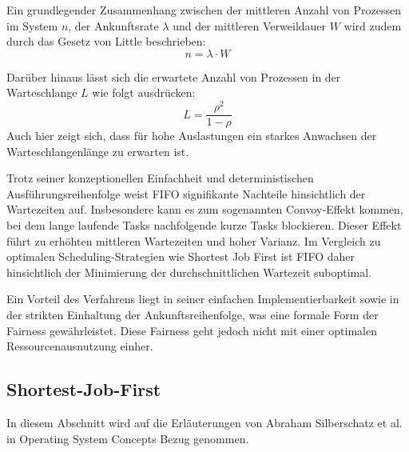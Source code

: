 \begin{sloppypar}
\vspace{7.56mm}

\noindent Ein grundlegender Zusammenhang zwischen der mittleren Anzahl von Prozessen im System $n$, der Ankunftsrate $\lambda$ und der mittleren Verweildauer $W$ wird zudem durch das Gesetz von Little beschrieben:
\begin{equation}
n = \lambda \cdot W
\end{equation}

\vspace{7.56mm}

\noindent Darüber hinaus lässt sich die erwartete Anzahl von Prozessen in der Warteschlange $L$ wie folgt ausdrücken:
\begin{equation}
L = \frac{\rho^2}{1 - \rho}
\end{equation}
Auch hier zeigt sich, dass für hohe Auslastungen ein starkes Anwachsen der Warteschlangenlänge zu erwarten ist.

\vspace{7.56mm}

\noindent Trotz seiner konzeptionellen Einfachheit und deterministischen Ausführungsreihenfolge weist \acs{FIFO} signifikante Nachteile hinsichtlich der Wartezeiten auf.
Insbesondere kann es zum sogenannten Convoy-Effekt kommen, 
bei dem lange laufende Tasks nachfolgende kurze Tasks blockieren.
Dieser Effekt führt zu erhöhten mittleren Wartezeiten und hoher Varianz.
Im Vergleich zu optimalen Scheduling-Strategien wie Shortest Job First ist \acs{FIFO} daher hinsichtlich der Minimierung der durchschnittlichen Wartezeit suboptimal.

\vspace{7.56mm}

\noindent Ein Vorteil des Verfahrens liegt in seiner einfachen Implementierbarkeit sowie in der strikten Einhaltung der Ankunftsreihenfolge, was eine formale Form der Fairness gewährleistet.
Diese Fairness geht jedoch nicht mit einer optimalen Ressourcenausnutzung einher.



\subsection{Shortest-Job-First}
\noindent In diesem Abschnitt wird auf die Erläuterungen von Abraham Silberschatz et al. in Operating System Concepts \cite{Silberschatz:2018} Bezug genommen.

\vspace{7.56mm}


\end{sloppypar}
